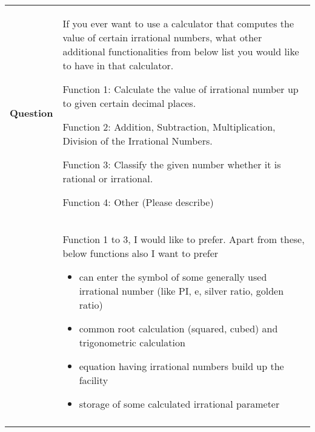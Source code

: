 \documentclass[12pt, letterpaper]{article}
\begin{document}
\begin{table}[H]
 			\centering
\begin{tabular}{p{0.71in}p{5.38in}}
\hline

\multicolumn{1}{|p{0.71in}}{\textbf{Question}} & 
\multicolumn{1}{|p{5.38in}|}{If you ever want to use a calculator that computes the value of certain irrational numbers, what other additional functionalities from below list you would like to have in that calculator. 
\vspace{\baselineskip}
\par Function 1: Calculate the value of irrational number up to given certain decimal places. \par Function 2: Addition, Subtraction, Multiplication, Division of the Irrational Numbers. \par Function 3: Classify the given number whether it is rational or irrational. \par Function 4: Other (Please describe) \par } \\
\hhline{--}

\multicolumn{1}{|p{0.71in}}{\textbf{Response}} & 
\multicolumn{1}{|p{5.38in}|}{Function 1 to 3, I would like to prefer. Apart from these, below functions also I want to prefer \par \begin{itemize}
	\item can enter the symbol of some generally used irrational number (like PI, e, silver ratio, golden ratio) \par 	\item common root calculation (squared, cubed) and trigonometric calculation \par 	\item equation having irrational numbers build up the facility \par 	\item storage of some calculated irrational parameter
\end{itemize} \par } \\
\hhline{--}

\end{tabular}
 \end{table}
 
 
\end{document}

